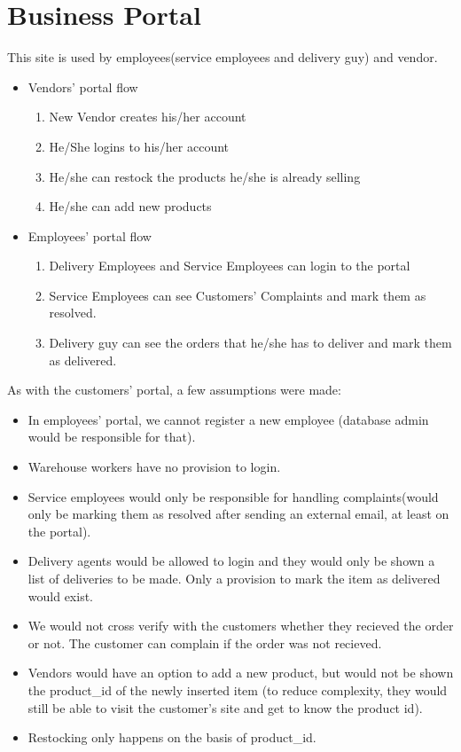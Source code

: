 \documentclass[12pt]{report}
\begin{document}
    \section{Business Portal}
    This site is used by employees(service employees and delivery guy) and vendor.
        \begin{itemize}
            \item Vendors' portal flow
                \begin{enumerate}
                    \item New Vendor creates his/her account 
                    \item He/She logins to his/her account
                    \item He/she can restock the products he/she is already selling
                    \item He/she can add new products
            \end{enumerate}
            \item Employees' portal flow
                \begin{enumerate}
                    \item Delivery Employees and Service Employees can login to the portal
                    \item Service Employees can see Customers' Complaints and mark them as resolved.
                    \item Delivery guy can see the orders that he/she has to deliver and mark them as delivered.    
            \end{enumerate}
        \end{itemize}
    As with the customers' portal, a few assumptions were made:
    \\
    \begin{itemize}
        \item In employees' portal, we cannot register a new employee (database admin would be responsible for that).
        \item Warehouse workers have no provision to login.
        \item Service employees would only be responsible for handling complaints(would only be marking them as resolved after sending an external email, at least on the portal).
        \item Delivery agents would be allowed to login and they would only be shown a list of deliveries to be made. Only a provision to mark the item as delivered would exist.
        \item We would not cross verify with the customers whether they recieved the order or not. The customer can complain if the order was not recieved.  
        \item Vendors would have an option to add a new product, but would not be shown the product\_id of the newly inserted item (to reduce complexity, they would still be able to visit the customer's site and get to know the product id).
        \item Restocking only happens on the basis of product\_id.
    \end{itemize}
\end{document}
